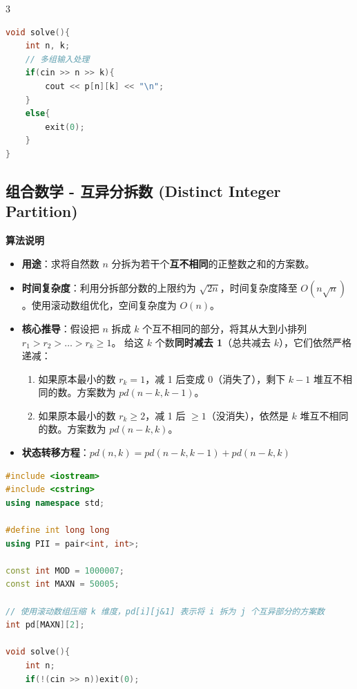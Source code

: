 \documentclass[10pt,landscape,a4paper]{article}
\begin{document}
\begin{multicols*}{3}
\begin{lstlisting}[language=C++]
void solve(){
    int n, k;
    // 多组输入处理
    if(cin >> n >> k){
        cout << p[n][k] << "\n";
    }
    else{
        exit(0);
    }
}
\end{lstlisting}
\subsection*{组合数学 - 互异分拆数 (Distinct Integer Partition)}
\par\addvspace{0.7ex}\noindent\textbf{算法说明}\par\nobreak
\begin{itemize}
\item \textbf{用途}：求将自然数 $n$ 分拆为若干个\textbf{互不相同}的正整数之和的方案数。
\item \textbf{时间复杂度}：利用分拆部分数的上限约为 $\sqrt{2n}$，时间复杂度降至 $O(n \sqrt{n})$。使用滚动数组优化，空间复杂度为 $O(n)$。
\item \textbf{核心推导}：假设把 $n$ 拆成 $k$ 个互不相同的部分，将其从大到小排列 $r_1 > r_2 > \dots > r_k \ge 1$。
给这 $k$ 个数\textbf{同时减去 1}（总共减去 $k$），它们依然严格递减：\par
\begin{enumerate}[start=1]
\item 如果原本最小的数 $r_k = 1$，减 1 后变成 0（消失了），剩下 $k-1$ 堆互不相同的数。方案数为 $pd(n-k, k-1)$。
\item 如果原本最小的数 $r_k \ge 2$，减 1 后 $\ge 1$（没消失），依然是 $k$ 堆互不相同的数。方案数为 $pd(n-k, k)$。
\end{enumerate}
\item \textbf{状态转移方程}：$pd(n, k) = pd(n-k, k-1) + pd(n-k, k)$
\end{itemize}
\par{}\par
\begin{lstlisting}[language=C++]
#include <iostream>
#include <cstring>
using namespace std;

#define int long long
using PII = pair<int, int>;

const int MOD = 1000007;
const int MAXN = 50005;

// 使用滚动数组压缩 k 维度，pd[i][j&1] 表示将 i 拆为 j 个互异部分的方案数
int pd[MAXN][2];

void solve(){
    int n;
    if(!(cin >> n))exit(0);


\end{lstlisting}
\end{multicols*}
\end{document}

